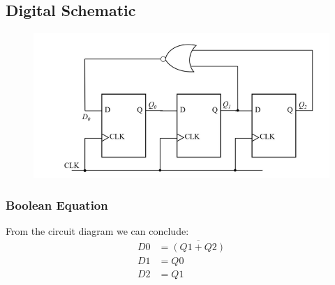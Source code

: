 \documentclass[journal,10pt]{article}
\begin{document}
\subsection{Digital Schematic}
\begin{center}
\begin{figure}[htbp]
        \centering
        \includegraphics[scale = 0.8]{1.png}
\end{figure}  
\end{center}

\subsubsection{Boolean Equation}
From the circuit diagram we can conclude:
\begin{align}
    D0 &=\overline{ (Q1 + Q2) }\\
    D1 &= Q0\\
    D2 &= Q1
\end{align}
\vspace{5pt}
\end{document}
